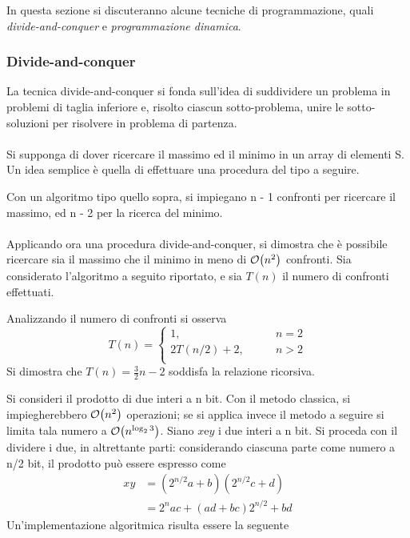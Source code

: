\documentclass{subfiles}
\begin{document}
In questa sezione si discuteranno alcune tecniche di programmazione, quali \emph{divide-and-conquer} e \emph{programmazione dinamica}.

\subsubsection{Divide-and-conquer}
La tecnica divide-and-conquer si fonda sull'idea di suddividere un problema in problemi di taglia inferiore e, risolto ciascun sotto-problema,
unire le sotto-soluzioni per risolvere in problema di partenza.
\\ \\
Si supponga di dover ricercare il massimo ed il minimo in un array di elementi S. Un idea semplice è quella di effettuare una procedura del tipo a seguire.


\noindent Con un algoritmo tipo quello sopra, si impiegano n - 1 confronti per ricercare il massimo, ed n - 2 per la ricerca del minimo.
\\ \\
Applicando ora una procedura divide-and-conquer, si dimostra che è possibile ricercare sia il massimo che il minimo in meno di \(\order{n^{2}}\) confronti.
Sia considerato l'algoritmo a seguito riportato, e sia \(T(n)\) il numero di confronti effettuati.


\noindent Analizzando il numero di confronti si osserva
\[
    T(n) = \begin{cases}
        1, \qquad           & n = 2 \\
        2T(n/2) + 2, \qquad & n > 2 \\
    \end{cases}
\]
\noindent Si dimostra che \(T(n) = \tfrac{3}{2} n - 2\) soddisfa la relazione ricorsiva.
\clearpage

\noindent Si consideri il prodotto di due interi a n bit. Con il metodo classica, si impiegherebbero \(\order{n^{2}}\) operazioni;
se si applica invece il metodo a seguire si limita tala numero a \(\order{n^{\log_{2}{3}}}\).
Siano \(x \text{e} y\) i due interi a n bit. Si proceda con il dividere i due, in altrettante parti:
considerando ciascuna parte come numero a n/2 bit, il prodotto può essere espresso come
\[
    \begin{aligned}
        xy & = (2^{n/2}a + b)(2^{n/2}c + d)     \\
           & =  2^{n}ac + (ad + bc)2^{n/2} + bd
    \end{aligned}
\]
\noindent Un'implementazione algoritmica risulta essere la seguente

\end{document}
